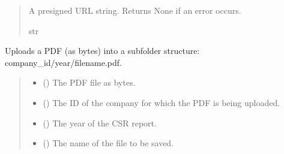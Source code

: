 \documentclass[letterpaper,10pt,english]{sphinxmanual}
\begin{document}
\begin{fulllineitems}
\begin{fulllineitems}
\begin{quote}
\begin{description}
\begin{itemize}
\end{itemize}

\sphinxAtStartPar
A presigned URL string. Returns None if an error occurs.

\sphinxAtStartPar
str

\end{description}\end{quote}

\end{fulllineitems}


\begin{fulllineitems}
\label{\detokenize{src.database:src.database.minio.MinioFileSystem.write_pdf_bytes}}
\pysigstartsignatures
\pysiglinewithargsret
{}
{\sphinxparamcomma {}\sphinxparamcomma {}\sphinxparamcomma {}}
{}
\pysigstopsignatures
\sphinxAtStartPar
Uploads a PDF (as bytes) into a subfolder structure: company\_id/year/filename.pdf.
\begin{quote}\begin{description}
\begin{itemize}
\item {} 
\sphinxAtStartPar
{} () \textendash{} The PDF file as bytes.

\item {} 
\sphinxAtStartPar
{} () \textendash{} The ID of the company for which the PDF is being uploaded.

\item {} 
\sphinxAtStartPar
{} () \textendash{} The year of the CSR report.

\item {} 
\sphinxAtStartPar
{} () \textendash{} The name of the file to be saved.


\end{itemize}
\end{description}
\end{quote}
\end{fulllineitems}
\end{fulllineitems}
\end{document}
